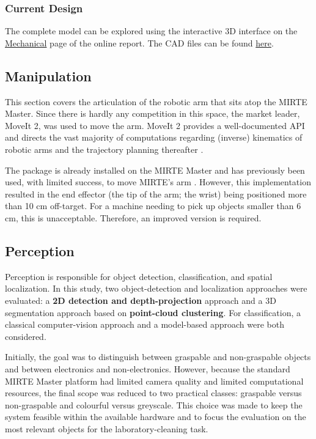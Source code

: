     \subsubsection{Current Design}
    The complete model can be explored using the interactive 3D interface on the \href{https://matt-rbt.github.io/Lab-Cleanup-Robot-using-the-Mirte-Master-Platform/mechanical/}{Mechanical} page of the online report. The CAD files can be found \href{https://cad.onshape.com/documents/ee158bec245e3fe46f63c9ce/w/a0c8c76ba94ff339073118d4/e/a16fbc4a88cf67fd9fba6368?renderMode=0&uiState=6a2aaef65092a9418fe6a8f1}{here}.

    \subsection{Manipulation}

    This section covers the articulation of the robotic arm that sits atop the MIRTE Master. Since there is hardly any competition in this space, the market leader, MoveIt 2, was used to move the arm. MoveIt 2 provides a well-documented API and directs the vast majority of computations regarding (inverse) kinematics of robotic arms and the trajectory planning thereafter \cite{moveit2_api}.

    The package is already installed on the MIRTE Master and has previously been used, with limited success, to move MIRTE's arm \cite{mirte_moveit_tutorial}. However, this implementation resulted in the end effector (the tip of the arm; the wrist) being positioned more than 10 cm off-target. For a machine needing to pick up objects smaller than 6 cm, this is unacceptable. Therefore, an improved version is required.
    
    \subsection{Perception}
    Perception is responsible for object detection, classification, and spatial localization. In this study, two object-detection and localization approaches were evaluated: a \textbf{2D detection and depth-projection} approach and a 3D segmentation approach based on \textbf{point-cloud clustering}. For classification, a classical computer-vision approach and a model-based approach were both considered.

    Initially, the goal was to distinguish between graspable and non-graspable objects and between electronics and non-electronics. However, because the standard MIRTE Master platform had limited camera quality and limited computational resources, the final scope was reduced to two practical classes: graspable versus non-graspable and colourful versus greyscale. This choice was made to keep the system feasible within the available hardware and to focus the evaluation on the most relevant objects for the laboratory-cleaning task.

